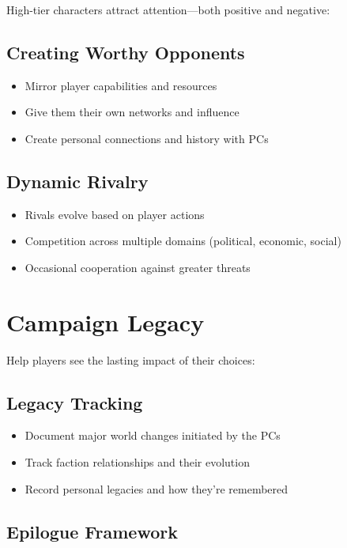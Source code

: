 High-tier characters attract attention---both positive and negative:

\subsection*{Creating Worthy Opponents}

\begin{itemize}
    \item Mirror player capabilities and resources
    \item Give them their own networks and influence
    \item Create personal connections and history with PCs
\end{itemize}

\subsection*{Dynamic Rivalry}

\begin{itemize}
    \item Rivals evolve based on player actions
    \item Competition across multiple domains (political, economic, social)
    \item Occasional cooperation against greater threats
\end{itemize}

\section{Campaign Legacy}

Help players see the lasting impact of their choices:

\subsection*{Legacy Tracking}

\begin{itemize}
    \item Document major world changes initiated by the PCs
    \item Track faction relationships and their evolution
    \item Record personal legacies and how they're remembered
\end{itemize}

\subsection*{Epilogue Framework}

